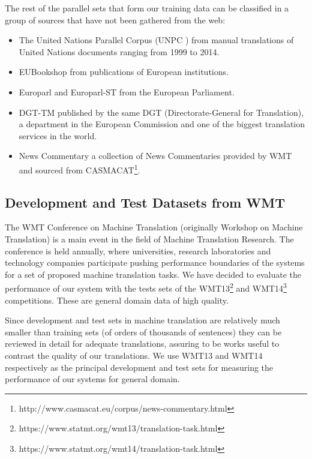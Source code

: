 \documentclass[11pt,english,listoffigures,listoftables]{tfgetsinf}
\begin{document}
The rest of the parallel sets that form our training data can be classified in a group of sources that have not been gathered from the web:
\begin{itemize}
    \item The United Nations Parallel Corpus (UNPC \cite{ziemski-etal-2016-united}) from manual translations of United Nations documents ranging from 1999 to 2014.
    \item EUBookshop \cite{skadins-etal-2014-billions} from publications of European institutions.
    \item Europarl \cite{koehn-2005-europarl} and Europarl-ST \cite{DBLP:journals/corr/abs-1911-03167} from the European Parliament.
    \item DGT-TM \cite{DBLP:journals/corr/SteinbergerEKPS13} published by the same DGT (Directorate-General for Translation), a department in the European Commission and one of the biggest translation services in the world.
    \item News Commentary \cite{TIEDEMANN12.463} a collection of News Commentaries provided by WMT and sourced from CASMACAT\footnote{http://www.casmacat.eu/corpus/news-commentary.html}.
\end{itemize}

\subsection{Development and Test Datasets from WMT}
The WMT Conference on Machine Translation (originally Workshop on Machine Translation) is a main event in the field of Machine Translation Research.
The conference is held annually, where universities, research laboratories and technology companies participate pushing performance boundaries of the systems for a set of proposed machine translation tasks.
We have decided to evaluate the performance of our system with the tests sets of the WMT13\footnote{https://www.statmt.org/wmt13/translation-task.html} and WMT14\footnote{https://www.statmt.org/wmt14/translation-task.html} competitions.
These are general domain data of high quality.

Since development and test sets in machine translation are relatively much smaller than training sets (of orders of thousands of sentences) they can be reviewed in detail for adequate translations, assuring to be works useful to contrast the quality of our translations.
We use WMT13 and WMT14 respectively as the principal development and test sets for measuring the performance of our systems for general domain. 
\end{document}
